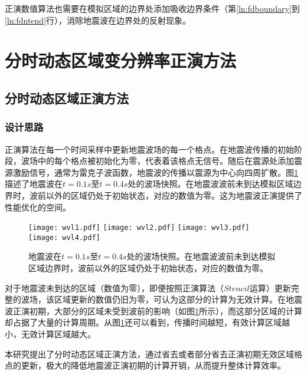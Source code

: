 正演数值算法也需要在模拟区域的边界处添加吸收边界条件（第\ref{ln:fdboundary}到\ref{ln:fdntend}行），消除地震波在边界处的反射现象。







\section{分时动态区域变分辨率正演方法} %
\subsection{分时动态区域正演方法} %

\subsubsection{设计思路}
正演算法在每一个时间采样中更新地震波场的每一个格点。在地震波传播的初始阶段，波场中的每个格点被初始化为零，代表着该格点无信号。随后在震源处添加震源激励信号，通常为雷克子波函数，地震波的传播以震源为中心向四周扩散。图\ref{fig:地震波传播示例}描述了地震波在$t=0.1s$至$t=0.4s$处的波场快照。在地震波波前未到达模拟区域边界时，波前以外的区域仍处于初始状态，对应的数值为零。这为地震波正演提供了性能优化的空间。

\begin{figure}[ht]
  \centering
  \texttt{[image: wvl1.pdf]}
  \texttt{[image: wvl2.pdf]}
  \texttt{[image: wvl3.pdf]}
  \texttt{[image: wvl4.pdf]}
  \caption{地震波在$t=0.1s$至$t=0.4s$处的波场快照。在地震波波前未到达模拟区域边界时，波前以外的区域仍处于初始状态，对应的数值为零。}
  \label{fig:地震波传播示例}
\end{figure}

对于地震波未到达的区域（数值为零），即便按照正演算法（$Stencil$运算）更新完整的波场，该区域更新的数值仍旧为零，可认为这部分的计算为无效计算。在地震波正演初期，大部分的区域未受到波前的影响（如图\ref{fig:地震波传播示例}所示），而这部分区域的计算却占据了大量的计算周期。从图\ref{fig:地震波传播示例}还可以看到，传播时间越短，有效计算区域越小，无效计算区域越大。

本研究提出了分时动态区域正演方法，通过省去或者部分省去正演初期无效区域格点的更新，极大的降低地震波正演初期的计算开销，从而提升整体计算效率。

